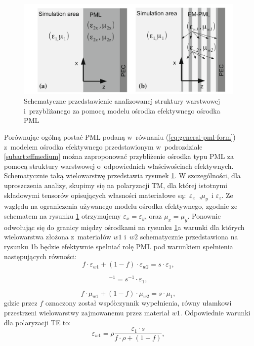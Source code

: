 \begin{figure}[tb]
	\includegraphics[width=\textwidth]{images/pml/oqe_schemat.png}
	\caption{Schematyczne przedstawienie analizowanej struktury warstwowej i~przybliżanego za pomocą modelu ośrodka efektywnego ośrodka PML}
	\label{fig:pml-multilay-schem}
\end{figure}

Porównując ogólną postać PML podaną w~równaniu (\ref{eq:general-pml-form}) z~modelem ośrodka efektywnego przedstawionym w~podrozdziale \ref{subart:effmedium} można zaproponować przybliżenie ośrodka typu PML za pomocą struktury warstwowej o~odpowiednich właściwościach efektywnych. Schematycznie taką wielowarstwę przedstawia rysunek \ref{fig:pml-multilay-schem}. W szczególności, dla uproszczenia analizy, skupimy się na polaryzacji TM, dla której istotnymi składowymi tensorów opisujących własności materiałowe są:~$\varepsilon_x$~,$\mu_y$~i $\varepsilon_z$. Ze względu na ograniczenia używanego modelu ośrodka efektywnego, zgodnie ze schematem na rysunku \ref{fig:pml-multilay-schem} otrzymujemy $\varepsilon_x=\varepsilon_y$, oraz $\mu_x=\mu_y$. Ponownie odwołując się do granicy między ośrodkami na rysunku \ref{fig:pml-multilay-schem}a warunki dla których wielowarstwa złożona z~materiałów $w1$ i~$w2$ schematycznie przedstawiona na rysunku \ref{fig:pml-multilay-schem}b będzie efektywnie spełniać rolę PML pod warunkiem spełnienia następujących równości:
\begin{equation}
	f\cdot \varepsilon_{w1} + (1-f)\cdot \varepsilon_{w2} = s \cdot \varepsilon_1,
	\label{eq:oqe4}
\end{equation}

\begin{equation}
	[f\cdot \varepsilon_{w1}^{-1}+(1-f)\varepsilon_{w2}^{-1}]^{-1}=s^{-1}\cdot \varepsilon_1,
	\label{eq:oqe5}
\end{equation}

\begin{equation}
	f\cdot \mu_{w1} + (1-f)\cdot \mu_{w2} = s \cdot \mu_1,
	\label{eq:oqe6}
\end{equation}
gdzie przez $f$ oznaczony został współczynnik wypełnienia, równy ułamkowi przestrzeni wielowarstwy zajmowanemu przez materiał $w1$. Odpowiednie warunki dla polaryzacji TE to:
\begin{equation}
	\varepsilon_{w1}=\rho \frac{\varepsilon_1 \cdot s}{f\cdot \rho + (1 -f) },
	\label{eq:te-eps1}
\end{equation}

